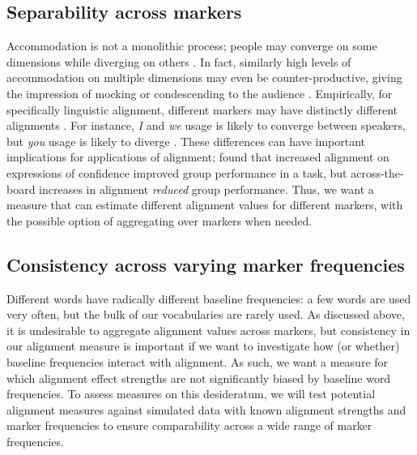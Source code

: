 \documentclass{acm_proc_article-sp}
\begin{document}
\subsection{Separability across markers}

Accommodation is not a monolithic process; people may converge on some dimensions while diverging on others \cite{BilousKrauss1988,Ferrara1991}. In fact, similarly high levels of accommodation on multiple dimensions may even be counter-productive, giving the impression of mocking or condescending to the audience \cite{GilesSmith1979,GilesCouplandCoupland1991}. Empirically, for specifically linguistic alignment, different markers may have distinctly different alignments \cite{DNMGamonDumais2011,IrelandEtAl2011}. For instance, \textit{I} and \textit{we} usage is likely to converge between speakers, but \textit{you} usage is likely to diverge \cite{NiederhofferPennebaker2002,GonzalesHancockPennebaker2010}. These differences can have important implications for applications of alignment; \cite{FusaroliEtAl2012} found that increased alignment on expressions of confidence improved group performance in a task, but across-the-board increases in alignment \emph{reduced} group performance.  Thus, we want a measure that can estimate different alignment values for different markers, with the possible option of aggregating over markers when needed.

\subsection{Consistency across varying marker frequencies} 

Different words have radically different baseline frequencies: a few words are used very often, but the bulk of our vocabularies are rarely used. As discussed above, it is undesirable to aggregate alignment values across markers, but consistency in our alignment measure is important if we want to investigate how (or whether) baseline frequencies interact with alignment.
As such, we want a measure for which alignment effect strengths are not significantly biased by baseline word frequencies. To assess measures on this desideratum, we will test potential alignment measures against simulated data with known alignment strengths and marker frequencies to ensure comparability across a wide range of marker frequencies.  %
\end{document}
